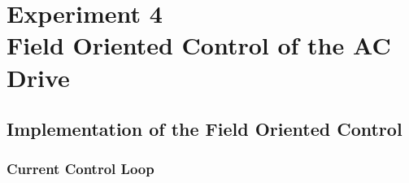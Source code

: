 \documentclass[12pt,a4paper, openany]{book}
\begin{document}




\setcounter{chapter}{3} %
\chapter{Experiment 4 \\   Field Oriented Control of the AC Drive}

 \setcounter{section}{3} %
\section{ Implementation of the Field Oriented Control}
\subsection{ Current Control Loop}
\end{document}
